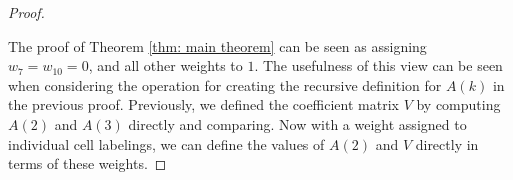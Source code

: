 \documentclass[12pt]{article}
\theoremstyle{plain}
\theoremstyle{definition}
\theoremstyle{remark}
\theoremstyle{definition}
\newcommand{\lablnode}[3]{\node[shape=circle,draw=none,fill=none, inner sep=0pt,minimum size=5pt] (A) at ( #1 , #2 ) {#3};}
\newcommand{\lablvertex}[3]{\node[shape=circle,draw=none,fill=white, inner sep=2pt,minimum size=5pt] (A) at ( #1 , #2 ) {#3};}
\begin{document}
\begin{proof}
\begin{center}
\end{center}

The proof of Theorem \ref{thm: main theorem} can be seen as assigning $w_{7} = w_{10} = 0$, and all other weights to $1$. The usefulness of this view can be seen when considering the operation for creating the recursive definition for $A(k)$ in the previous proof. Previously, we defined the coefficient matrix $V$ by computing $A(2)$ and $A(3)$ directly and comparing. Now with a weight assigned to individual cell labelings, we can define the values of $A(2)$ and $V$ directly in terms of these weights.


\end{proof}
\end{document}
